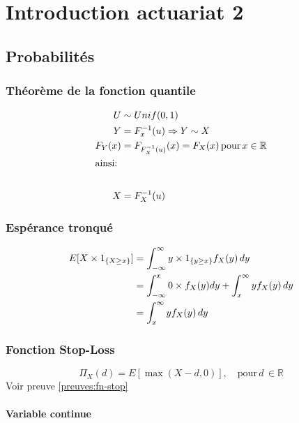 \chapter{Introduction actuariat 2}\label{introduction-actuariat-2}
\section{Probabilités}
\subsection{Théorème de la fonction quantile}\label{theoreme-de-la-fonction-quantile}


\label{Théorème de la fonctions quantile}
\begin{align*}
U &\sim Unif(0,1)\\
Y &=F_x^{-1}(u) \Rightarrow Y \sim X\\
F_Y(x) &=F_{F_X^{-1}(u)}(x)=F_X(x)\, \text{pour}\, x \in \mathbb{R}\\
\intertext{ainsi:}\\
X &=F_X^{-1}(u)
\end{align*}




\subsection{Espérance tronqué}\label{intro:espuxe9tron}


\begin{align*}
	E[X \times \mathrm{1}_{ \{ X \ge x \} }]& =\int_{-\infty}^\infty y \times \mathrm{1}_{ \{ y \ge x			\}}f_X(y)\, dy \notag \\ 
	& =\int_{-\infty}^x 0\times f_X(y) dy + \int_x^\infty y f_X(y)\,dy \notag \\
	& =\int_x^\infty y f_X(y)\,dy 
\end{align*}


\subsection{Fonction Stop-Loss}\label{intro:fn-stop}

\[
    \Pi_X(d) = E\left[\max(X-d,0)\right],\quad\text{pour}\,d \,\in \mathbb{R}
\] Voir preuve \ref{preuves:fn-stop}

\subsubsection*{Variable continue}\label{variable-continue}

